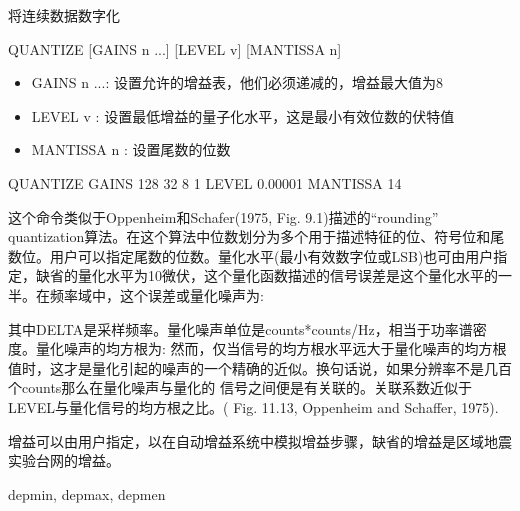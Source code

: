 \label{cmd:quantize}

将连续数据数字化

\begin{SACSTX}
QUANTIZE [GAINS n ...] [LEVEL v] [MANTISSA n]
\end{SACSTX}

\begin{itemize}
\item GAINS n ...: 设置允许的增益表，他们必须递减的，增益最大值为8 
\item LEVEL v :  设置最低增益的量子化水平，这是最小有效位数的伏特值 
\item MANTISSA n : 设置尾数的位数 
\end{itemize}

\begin{SACDFT}
QUANTIZE GAINS 128 32 8 1 LEVEL 0.00001 MANTISSA 14
\end{SACDFT}

这个命令类似于Oppenheim和Schafer(1975, Fig. 9.1)描述的``rounding'' quantization算法。在这个算法中位数划分为多个用于描述特征的位、符号位和尾数位。用户可以指定尾数的位数。量化水平(最小有效数字位或LSB)也可由用户指定，缺省的量化水平为10微伏，这个量化函数描述的信号误差是这个量化水平的一半。在频率域中，这个误差或量化噪声为:

其中DELTA是采样频率。量化噪声单位是counts*counts/Hz，相当于功率谱密度。量化噪声的均方根为:
然而，仅当信号的均方根水平远大于量化噪声的均方根值时，这才是量化引起的噪声的一个精确的近似。换句话说，如果分辨率不是几百个counts那么在量化噪声与量化的	信号之间便是有关联的。关联系数近似于LEVEL与量化信号的均方根之比。( Fig. 11.13, 	Oppenheim and Schaffer, 1975).

增益可以由用户指定，以在自动增益系统中模拟增益步骤，缺省的增益是区域地震实验台网的增益。

depmin, depmax, depmen
